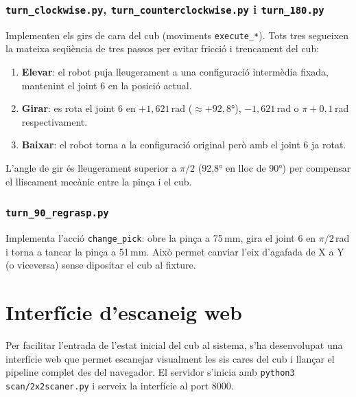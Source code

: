 \documentclass[12pt, a4paper]{article}
\begin{document}
\subsubsection{\texttt{turn\_clockwise.py}, \texttt{turn\_counterclockwise.py} i \texttt{turn\_180.py}}

Implementen els girs de cara del cub (moviments \texttt{execute\_*}). Tots tres segueixen la mateixa seqüència de tres passos per evitar fricció i trencament del cub:

\begin{enumerate}
  \item \textbf{Elevar}: el robot puja lleugerament a una configuració intermèdia fixada, mantenint el joint 6 en la posició actual.
  \item \textbf{Girar}: es rota el joint 6 en $+1{,}621$\,rad ($\approx+92{,}8°$), $-1{,}621$\,rad o $\pi+0{,}1$\,rad respectivament.
  \item \textbf{Baixar}: el robot torna a la configuració original però amb el joint 6 ja rotat.
\end{enumerate}

L'angle de gir és lleugerament superior a $\pi/2$ (92,8° en lloc de 90°) per compensar el lliscament mecànic entre la pinça i el cub.

\subsubsection{\texttt{turn\_90\_regrasp.py}}

Implementa l'acció \texttt{change\_pick}: obre la pinça a 75\,mm, gira el joint 6 en $\pi/2$\,rad i torna a tancar la pinça a 51\,mm. Això permet canviar l'eix d'agafada de X a Y (o viceversa) sense dipositar el cub al fixture.

\section{Interfície d'escaneig web}

Per facilitar l'entrada de l'estat inicial del cub al sistema, s'ha desenvolupat una interfície web que permet escanejar visualment les sis cares del cub i llançar el pipeline complet des del navegador. El servidor s'inicia amb \texttt{python3 scan/2x2scaner.py} i serveix la interfície al port 8000.

\end{document}
